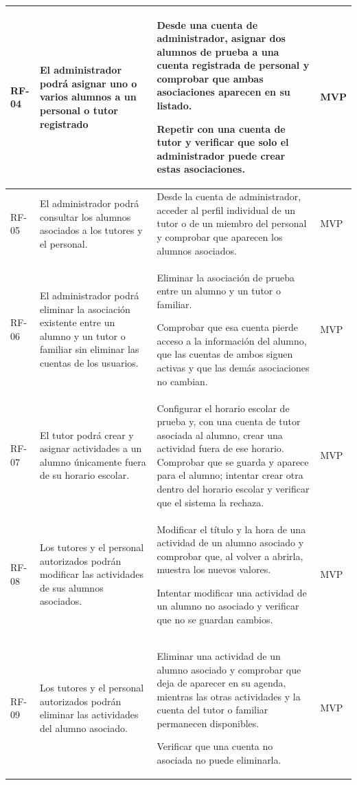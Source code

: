 \begin{longtable}{|>{\raggedright\arraybackslash}p{1cm}|>{\raggedright\arraybackslash}p{6cm}|>{\criterioinicio}p{5.9cm}<{\criteriofin}|>{\centering\arraybackslash}p{1.8cm}|}
\hline
\hypertarget{rf-04}{}RF-04 & El administrador podrá asignar uno o varios alumnos a un personal o tutor registrado & Desde una cuenta de administrador, asignar dos alumnos de prueba a una cuenta registrada de personal y comprobar que ambas asociaciones aparecen en su listado. \item Repetir con una cuenta de tutor y verificar que solo el administrador puede crear estas asociaciones. & MVP \\
\hline
\hypertarget{rf-05}{}RF-05 & El administrador podrá consultar los alumnos asociados a los tutores y el personal. & Desde la cuenta de administrador, acceder al perfil individual de un tutor o de un miembro del personal y comprobar que aparecen los alumnos asociados. & MVP \\
\hline
\hypertarget{rf-06}{}RF-06 & El administrador podrá eliminar la asociación existente entre un alumno y un tutor o familiar sin eliminar las cuentas de los usuarios. & Eliminar la asociación de prueba entre un alumno y un tutor o familiar. \item Comprobar que esa cuenta pierde acceso a la información del alumno, que las cuentas de ambos siguen activas y que las demás asociaciones no cambian. & MVP \\
\hline
\hypertarget{rf-07}{}RF-07 & El tutor podrá crear y asignar actividades a un alumno únicamente fuera de su horario escolar. & Configurar el horario escolar de prueba y, con una cuenta de tutor asociada al alumno, crear una actividad fuera de ese horario. Comprobar que se guarda y aparece para el alumno; intentar crear otra dentro del horario escolar y verificar que el sistema la rechaza. & MVP \\
\hline
\hypertarget{rf-08}{}RF-08 & Los tutores y el personal autorizados podrán modificar las actividades de sus alumnos asociados. & Modificar el título y la hora de una actividad de un alumno asociado y comprobar que, al volver a abrirla, muestra los nuevos valores. \item Intentar modificar una actividad de un alumno no asociado y verificar que no se guardan cambios. & MVP \\
\hline
\hypertarget{rf-09}{}RF-09 & Los tutores y el personal autorizados podrán eliminar las actividades del alumno asociado. & Eliminar una actividad de un alumno asociado y comprobar que deja de aparecer en su agenda, mientras las otras actividades y la cuenta del tutor o familiar permanecen disponibles. \item Verificar que una cuenta no asociada no puede eliminarla. & MVP \\

\end{longtable}
